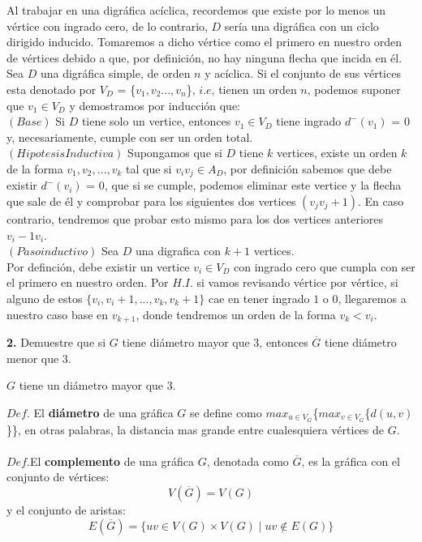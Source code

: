 \documentclass[12pt]{article}
\begin{document}
Al trabajar en una digráfica acíclica, recordemos que existe por lo menos un vértice con ingrado cero, 
de lo contrario, $D$ sería una digráfica con un ciclo dirigido inducido. Tomaremos a dicho vértice como 
el primero en nuestro orden de vértices debido a que, por definición, no hay ninguna flecha que incida en él. \\

Sea $D$ una digráfica simple, de orden $n$ y acíclica. Si el conjunto de sus vértices esta denotado 
por $V_D$  = \{$v_1, v_2  . . . , v_n$\}, $i.e$, tienen un orden $n$, podemos suponer que  $v_1 \in V_D$
y demostramos por inducción que:\\

$(Base)$ Si $D$ tiene solo un vertice, entonces $v_1 \in V_D$ tiene ingrado $d^-(v_1)$ = 0 y, necesariamente, cumple con ser un orden total.\\

$(Hipotesis Inductiva)$ Supongamos que si $D$ tiene $k$ vertices, existe un orden $k$ de la forma 
$v_1, v_2, \dots, v_k$ tal que si $v_i v_j \in A_D$, por definición sabemos que debe existir $d^-(v_i)$ = 0, que si se cumple, 
podemos eliminar este vertice y la flecha que sale de él y comprobar para los siguientes dos vertices $(v_j v_j+1)$. 
En caso contrario, tendremos que probar esto mismo para los dos vertices anteriores $v_i-1 v_i$.\\

$(Paso inductivo)$ Sea $D$ una digrafica con $k + 1$ vertices.\\

Por definción, debe existir un vertice $v_i \in V_D$ con ingrado cero que cumpla con ser el primero en nuestro orden. Por $H.I.$
si vamos revisando vértice por vértice, si alguno de estos $\{v_i, v_i+1, ..., v_k, v_k+1\}$ cae en tener ingrado $1$ o $0$, llegaremos a nuestro caso base en $v_{k+1}$,
donde tendremos un orden de la forma $v_k < v_i$. 

\vspace{1cm}

%
%
\textbf{2.} Demuestre que si $G$ tiene diámetro mayor que 3, entonces $\overline{G}$ tiene diámetro menor que 3.

\begin{tcolorbox}[title=\textbf{Hipotesis}, colback=red!15!white, colframe=black!, breakable]
    $G$ tiene un diámetro mayor que 3.
\end{tcolorbox}
\begin{tcolorbox}[title=\textbf{Definiciones}, colback=blue!15!white, colframe=black!, breakable]
    $Def$. El \textbf{diámetro} de una gráfica $G$ se define como $max_{u\in V_G}$\{$max_{v\in V_G}$\{${d(u,v)}$\}\}, en otras palabras, la distancia mas grande entre cualesquiera vértices de $G$.
    \\
    \\
    $Def$.El \textbf{complemento} de una gráfica $G$, denotada como $\overline{G}$, es la gráfica con el conjunto de vértices:
    \[V(\overline{G}) = V(G)\]
    y el conjunto de aristas:
    \[E(\overline{G}) = \{ uv \in V(G) \times V(G) \mid uv \notin E(G)\}\]
\end{tcolorbox}
\end{document}
